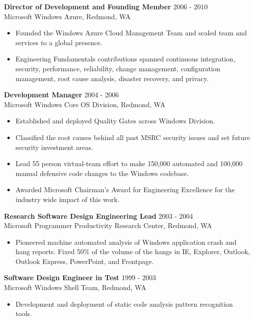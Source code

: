 \begin{resume}
{\bf Director of Development and Founding Member} \hfill 2006 - 2010\\
 Microsoft Windows Azure, Redmond, WA
 \begin{itemize} \itemsep -2pt
 \item Founded the Windows Azure Cloud Management Team and scaled team and services to a global presence.
 \item Engineering Fundamentals contributions spanned continuous integration, security, performance, reliability, change management, configuration management, root cause analysis, disaster recovery, and privacy.
 \end{itemize}

{\bf Development Manager} \hfill 2004 - 2006\\
 Microsoft Windows Core OS Division, Redmond, WA
 \begin{itemize} \itemsep -2pt  %
 \item Established and deployed Quality Gates across Windows Division.
 \item Classified the root causes behind all past MSRC security issues and set future security investment areas.
 \item Lead 55 person virtual-team effort to make 150,000 automated and 100,000 manual defensive code changes to the Windows codebase.
 \item Awarded Microsoft Chairman's Award for Engineering Excellence for the industry wide impact of this work.
 
 \end{itemize}

 {\bf Research Software Design Engineering Lead} \hfill 2003 - 2004\\
 Microsoft Programmer Productivity Research Center, Redmond, WA
 \begin{itemize} \itemsep -2pt  %
 \item Pioneered machine automated analysis of Windows application crash and hang reports. Fixed 50\% of the volume of the hangs in IE, Explorer, Outlook, Outlook Express, PowerPoint, and Frontpage.
 \end{itemize}
 
 {\bf Software Design Engineer in Test} \hfill 1999 - 2003\\
 Microsoft Windows Shell Team, Redmond, WA
 \begin{itemize} \itemsep -2pt
 \item Development and deployment of static code analysis pattern recognition tools.
 \end{itemize}
 

\end{resume}
